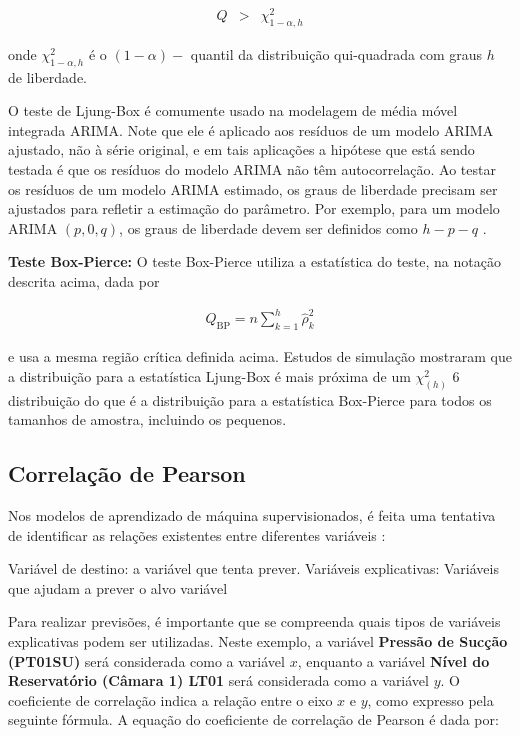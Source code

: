 \begin{eqnarray}
	Q&>&\chi_{1-\alpha, h}^2
\end{eqnarray}

\noindent onde $\chi_{1-\alpha, h}^2$ é o $(1-\alpha)-$ quantil \cite{Brockwell2002} da distribuição qui-quadrada com graus $h$ de liberdade.

O teste de Ljung-Box é comumente usado na modelagem de média móvel integrada ARIMA. Note que ele é aplicado aos resíduos de um modelo ARIMA ajustado, não à série original, e em tais aplicações a hipótese que está sendo testada é que os resíduos do modelo ARIMA não têm autocorrelação. Ao testar os resíduos de um modelo ARIMA estimado, os graus de liberdade precisam ser ajustados para refletir a estimação do parâmetro. Por exemplo, para um modelo ARIMA $(p,0,q)$, os graus de liberdade devem ser definidos como $h-p-q$ \cite{Davidson2000}.

\noindent\textbf{Teste Box-Pierce: }
O teste Box-Pierce utiliza a estatística do teste, na notação descrita acima, dada por \cite{box}

\begin{eqnarray}
	Q_{\mathrm{BP}}=n \sum_{k=1}^h \hat{\rho}_k^2
\end{eqnarray}

\noindent e usa a mesma região crítica definida acima.
Estudos de simulação mostraram que a distribuição para a estatística Ljung-Box é mais próxima de um $\chi^2_{(h)}$ 6 distribuição do que é a distribuição para a estatística Box-Pierce para todos os tamanhos de amostra, incluindo os pequenos.


\subsection{Correla\c c\~ao de Pearson}

Nos modelos de aprendizado de máquina supervisionados, é feita uma tentativa de identificar as relações existentes entre diferentes variáveis \cite{korstanje2021}:

Variável de destino: a variável que tenta prever.
Variáveis explicativas: Variáveis que ajudam a prever o alvo variável


Para realizar previsões, é importante que se compreenda quais tipos de variáveis explicativas podem ser utilizadas. Neste exemplo, a variável \textbf{Pressão de Sucção (PT01SU)} será considerada como a variável $x$, enquanto a variável \textbf{Nível do Reservatório (Câmara 1) LT01} será considerada como a variável $y$. O coeficiente de correlação indica a relação entre o eixo $x$ e $y$, como expresso pela seguinte fórmula.
A equação do coeficiente de correlação de Pearson é dada por:

